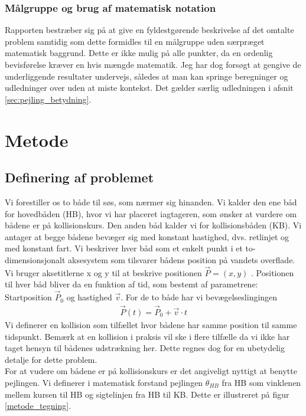 \documentclass[%
 reprint,
nofootinbib,
aps,
]{revtex4-1}
\begin{document}
\subsubsection{Målgruppe og brug af matematisk notation}
Rapporten bestræber sig på at give en fyldestgørende beskrivelse af det omtalte problem samtidig som dette formidles til en målgruppe uden særpræget matematisk baggrund. Dette er ikke mulig på alle punkter, da en ordenlig bevisførelse kræver en hvis mængde matematik. Jeg har dog forsøgt at gengive de underliggende resultater undervejs, således at man kan springe beregninger og udledninger over uden at miste kontekst. Det gælder særlig udledningen i afsnit \ref{sec:pejling_betydning}.




\section{Metode}
\subsection{Definering af problemet}
Vi forestiller os to både til søs, som nærmer sig hinanden. Vi kalder den ene båd for hovedbåden (HB), hvor vi har placeret iagtageren, som ønsker at vurdere om bådene er på kollisionskurs. Den anden båd kalder vi for kollisionsbåden (KB). Vi antager at begge bådene bevæger sig med konstant hastighed, dvs. retlinjet og med konstant fart. Vi beskriver hver båd som et enkelt punkt i et to-dimensionsjonalt aksesystem som tilsvarer bådens position på vandets overflade. Vi bruger aksetitlerne x og y til at beskrive positionen $\vec{P} = (x, y)$ . Positionen til hver båd bliver da en funktion af tid, som bestemt af parametrene: Startposition $\vec{P}_0$ og hastighed $\vec{v}$. For de to både har vi bevægelseslingingen
\begin{align}
  \vec{P}(t) =  \vec{P}_0 + \vec{v}\cdot t
  \label{eq:motion}
\end{align}
Vi definerer en kollision som tilfællet hvor bådene har samme position til samme tidspunkt. Bemærk at en kollision i praksis vil ske i flere tilfælle da vi ikke har taget hensyn til bådenes udstrækning her. Dette regnes dog for en ubetydelig detalje for dette problem.\\
For at vudere om bådene er på kollisionskurs er det angiveligt nyttigt at benytte pejlingen. Vi definerer i matematisk forstand pejlingen $\theta_{HB}$ fra HB som vinklenen mellem kursen til HB og sigtelinjen fra HB til KB. Dette er illustreret på figur \ref{metode_tegning}.
\end{document}
